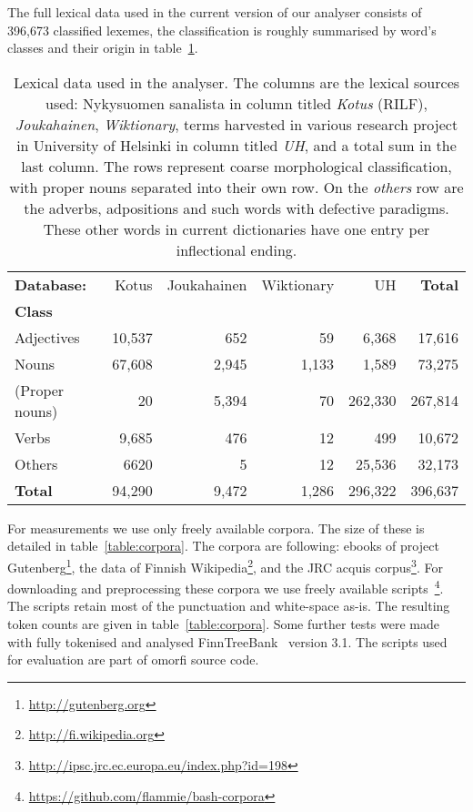 \documentclass[a4paper,12pt]{article}
\begin{document}
The full lexical data used in the current version of our analyser consists of
396,673 classified lexemes, the classification is roughly summarised by word's
classes and their origin in table~\ref{table:lexical}. 

\begin{table}
    \begin{scriptsize}
  \centering
    \begin{tabular}{|l|r|r|r|r||r|}
        \hline
        \bf Database: & Kotus & Joukahainen & Wiktionary & UH & \bf Total \\
        \bf Class   & & & & & \\
        \hline
        Adjectives     & 10,537 & 652   & 59    & 6,368   & 17,616  \\
        Nouns          & 67,608 & 2,945 & 1,133 & 1,589   & 73,275  \\
        (Proper nouns) & 20     & 5,394 & 70    & 262,330 & 267,814 \\
        Verbs          & 9,685  & 476   & 12    & 499     & 10,672  \\
        Others         & 6620   & 5     & 12    & 25,536  & 32,173  \\
        \hline
        \bf Total      & 94,290 & 9,472 & 1,286 & 296,322 & 396,637 \\
        \hline
    \end{tabular}
  \caption{Lexical data used in the analyser.  The columns are the lexical
      sources used: Nykysuomen sanalista in column titled \emph{Kotus} (RILF),
      \emph{Joukahainen}, \emph{Wiktionary}, terms harvested in various
      research project in University of Helsinki in column titled \emph{UH},
      and a total sum in the last column. The rows represent coarse
      morphological classification, with proper nouns separated into their own
      row. On the \emph{others} row are the adverbs, adpositions and such words
      with defective paradigms. These other words in current dictionaries have one
      entry per inflectional ending.
  \label{table:lexical}}
  \end{scriptsize}
\end{table}


For measurements we use only freely available corpora. The size of these is
detailed in table~\ref{table:corpora}. The corpora are following: ebooks of project
Gutenberg\footnote{\url{http://gutenberg.org}}, the data of Finnish
Wikipedia\footnote{\url{http://fi.wikipedia.org}}, and the JRC acquis
corpus\footnote{\url{http://ipsc.jrc.ec.europa.eu/index.php?id=198}}. For
downloading and preprocessing these corpora we use freely available
scripts~\footnote{\url{https://github.com/flammie/bash-corpora}}. The scripts
retain most of the punctuation and white-space as-is. The resulting
token counts are given in table~\ref{table:corpora}. Some further tests were made
with fully tokenised and analysed
FinnTreeBank~\citep{voutilainen2012specifying} version 3.1.  The scripts used
for evaluation are part of omorfi source code.
\end{document}
